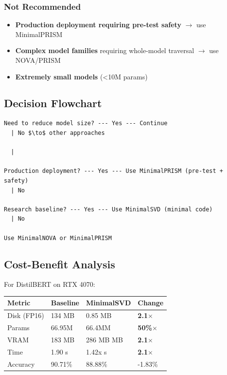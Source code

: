 \subsubsection{Not Recommended}

\begin{itemize}
\item \textbf{Production deployment requiring pre-test safety} $\to$ use MinimalPRISM
\item \textbf{Complex model families} requiring whole-model traversal $\to$ use NOVA/PRISM
\item \textbf{Extremely small models} (<10M params)

\end{itemize}
\subsection{Decision Flowchart}

\begin{lstlisting}
Need to reduce model size? --- Yes --- Continue
  | No $\to$ other approaches

  |
   
Production deployment? --- Yes --- Use MinimalPRISM (pre-test + safety)
  | No
   
Research baseline? --- Yes --- Use MinimalSVD (minimal code)
  | No
   
Use MinimalNOVA or MinimalPRISM
\end{lstlisting}

\subsection{Cost-Benefit Analysis}

For DistilBERT on RTX 4070:

\begin{table}[H]
\centering
\small
\begin{tabular}{llll}
\toprule
\textbf{Metric} & \textbf{Baseline} & \textbf{MinimalSVD} & \textbf{Change} \\
\midrule
Disk (FP16) & 134 MB & 0.85 MB & \textbf{2.1$\times$} \\
Params & 66.95M & 66.4MM & \textbf{50\%$\times$} \\
VRAM & 183 MB & 286 MB MB & \textbf{2.1$\times$} \\
Time & 1.90 s & 1.42x s & \textbf{2.1$\times$} \\
Accuracy & 90.71\% & 88.88\% & -1.83\% \\
\bottomrule
\end{tabular}
\end{table}

